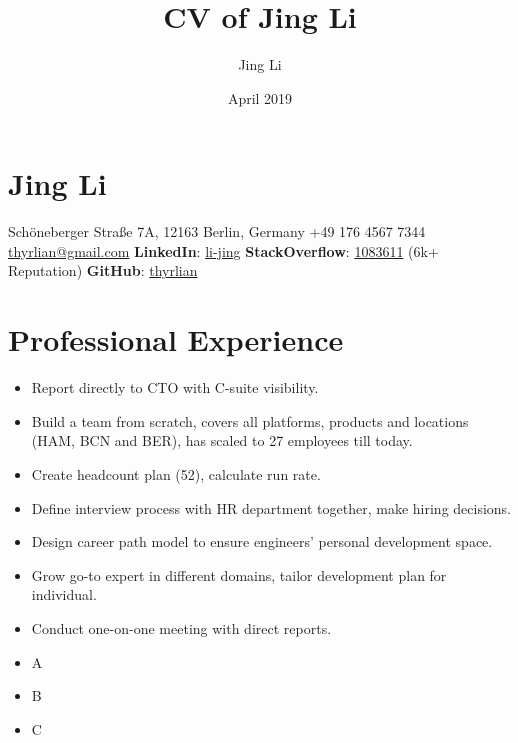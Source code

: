 \documentclass{cv}
\title{CV of Jing Li}
\author{Jing Li}
\date{April 2019}
\begin{document}

\section*{Jing Li}

\begin{itemize}
  \renewcommand{\labelitemi}{}
  \setlength\itemsep{0em}
  \fancyiconitem{\faHome} Schöneberger Straße 7A, 12163 Berlin, Germany
  \fancyiconitem{\faPhone} +49 176 4567 7344
  \fancyiconitem{\faEnvelope} \href{mailto:thyrlian@gmail.com}{thyrlian@gmail.com}
  \fancyiconitem{\faLinkedin} \textbf{LinkedIn}: \href{https://www.linkedin.com/in/li-jing/}{li-jing}
  \fancyiconitem{\faStackOverflow} \textbf{StackOverflow}: \href{https://stackoverflow.com/users/1083611/jing-li}{1083611} (6k+ Reputation)
  \fancyiconitem{\faGithub} \textbf{GitHub}: \href{https://github.com/thyrlian}{thyrlian}
\end{itemize}

\section*{Professional Experience}


\begin{itemize}
  \setlength\itemsep{0em}
  \item Report directly to CTO with C-suite visibility.
  \item Build a team from scratch, covers all platforms, products and locations (HAM, BCN and BER), has scaled to 27 employees till today.
  \item Create headcount plan (52), calculate run rate.
  \item Define interview process with HR department together, make hiring decisions.
  \item Design career path model to ensure engineers’ personal development space.
  \item Grow go-to expert in different domains, tailor development plan for individual.
  \item Conduct one-on-one meeting with direct reports.
\end{itemize}


\begin{itemize}
  \setlength\itemsep{0em}
  \item A
  \item B
  \item C
\end{itemize}
\end{document}

